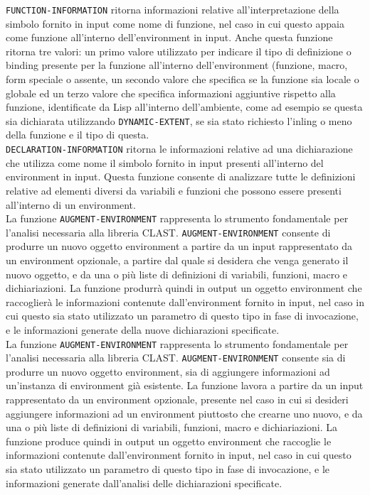 \texttt{FUNCTION-INFORMATION} ritorna informazioni relative
all’interpretazione della simbolo fornito in input come nome di funzione, nel
caso in cui questo appaia come funzione all’interno dell’environment in input.
Anche questa funzione ritorna tre valori: un primo valore utilizzato per
indicare il tipo di definizione o binding presente per la funzione all’interno
dell’environment (funzione, macro, form speciale o assente, un secondo valore
che specifica se la funzione sia locale o globale ed un terzo valore che
specifica informazioni aggiuntive rispetto alla funzione, identificate da Lisp
all’interno dell’ambiente, come ad esempio se questa sia dichiarata
utilizzando \texttt {DYNAMIC-EXTENT}, se sia stato richiesto l’inling o meno
della funzione e il tipo di questa.\\

\texttt{DECLARATION-INFORMATION} ritorna le informazioni relative ad una
dichiarazione che utilizza come nome il simbolo fornito in input presenti
all’interno del environment in input. Questa funzione consente di analizzare
tutte le definizioni relative ad elementi diversi da variabili e funzioni che
possono essere presenti all’interno di un environment.\\

La funzione \texttt{AUGMENT-ENVIRONMENT} rappresenta lo strumento fondamentale
per l’analisi necessaria alla libreria CLAST. \texttt{AUGMENT-ENVIRONMENT}
consente di produrre un nuovo oggetto environment a partire da un input
rappresentato da un environment opzionale, a partire dal quale si desidera che
venga generato il nuovo oggetto, e da una o più liste di definizioni di
variabili, funzioni, macro e dichiariazioni. La funzione produrrà quindi in
output un oggetto environment che raccoglierà le informazioni contenute
dall'environment fornito in input, nel caso in cui questo sia stato utilizzato
un parametro di questo tipo in fase di invocazione, e le informazioni generate
della nuove dichiarazioni specificate.\\

La funzione \texttt{AUGMENT-ENVIRONMENT} rappresenta lo strumento fondamentale
per l’analisi necessaria alla libreria CLAST. \texttt{AUGMENT-ENVIRONMENT}
consente sia di produrre un nuovo oggetto environment, sia di aggiungere
informazioni ad un'instanza di environment già esistente. La funzione lavora a
partire da un input rappresentato da un environment opzionale, presente nel
caso in cui si desideri aggiungere informazioni ad un environment piuttosto
che crearne uno nuovo, e da una o più liste di definizioni di variabili,
funzioni, macro e dichiariazioni. La funzione produce quindi in output un
oggetto environment che raccoglie le informazioni contenute dall'environment
fornito in input, nel caso in cui questo sia stato utilizzato un parametro di
questo tipo in fase di invocazione, e le informazioni generate dall'analisi
delle dichiarazioni specificate.\\

